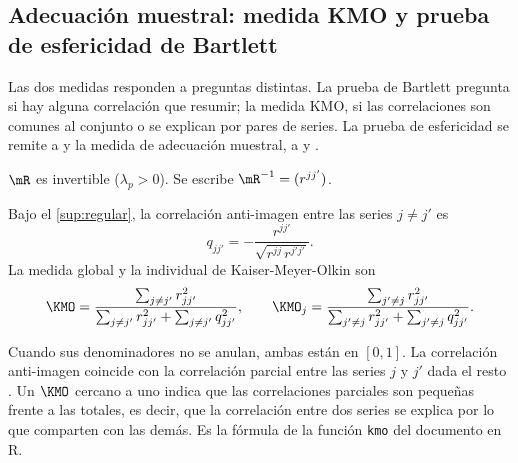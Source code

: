 \subsection{Adecuación muestral: medida KMO y prueba de esfericidad de Bartlett}
\label{sec:adecuacion}

Las dos medidas responden a preguntas distintas. La prueba de Bartlett pregunta si hay alguna
correlación que resumir; la medida KMO, si las correlaciones son comunes al conjunto o se explican
por pares de series. La prueba de esfericidad se remite a
\textcite{bartlett_1950,bartlett_1951} y la medida de adecuación muestral, a
\textcite{kaiser_1970} y \textcite{kaiser_rice_1974}.

\begin{supuesto}\label{sup:regular}
$\mR$ es invertible ($\lambda_p>0$). Se escribe $\mR^{-1}=(r^{jj'})$.
\end{supuesto}

\begin{definicion}\label{def:kmo}
Bajo el \cref{sup:regular}, la correlación anti-imagen entre las series $j\ne j'$ es
\[
  q_{jj'}=-\frac{r^{jj'}}{\sqrt{r^{jj}\,r^{j'j'}}} .
\]
La medida global y la individual de Kaiser-Meyer-Olkin son
\begin{equation}\label{eq:kmo}
  \KMO=\frac{\sum_{j\ne j'}r_{jj'}^2}{\sum_{j\ne j'}r_{jj'}^2+\sum_{j\ne j'}q_{jj'}^2},
  \qquad
  \KMO_j=\frac{\sum_{j'\ne j}r_{jj'}^2}{\sum_{j'\ne j}r_{jj'}^2+\sum_{j'\ne j}q_{jj'}^2}.
\end{equation}
\end{definicion}

Cuando sus denominadores no se anulan, ambas están en $[0,1]$. La correlación anti-imagen coincide con la correlación parcial entre las
series $j$ y $j'$ dada el resto . Un $\KMO$ cercano a uno indica que las
correlaciones parciales son pequeñas frente a las totales, es decir, que la correlación entre dos
series se explica por lo que comparten con las demás. Es la fórmula de la función \texttt{kmo} del
documento en R.

